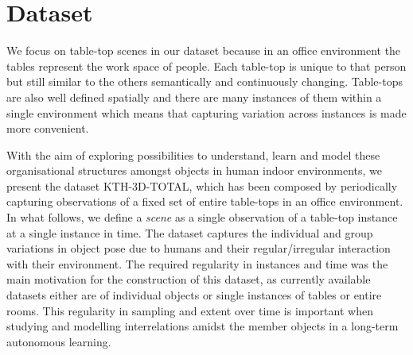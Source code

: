 \documentclass[letterpaper, 10 pt, conference]{ieeeconf}  %
\begin{document}
\section{Dataset}
\label{sec:Dataset}
We focus on table-top scenes in our dataset because in an office 
environment the tables represent the work space of people. Each 
table-top is unique to that person but still similar to the others 
semantically and continuously changing. Table-tops are also well 
defined spatially and there are many instances of them within a 
single environment which means that capturing variation across 
instances is made more convenient.

With the aim of exploring possibilities to understand, learn and model these organisational structures amongst objects in human indoor 
environments, we present the dataset KTH-3D-TOTAL, which has been composed by periodically capturing observations of a fixed set of entire 
table-tops in an office environment. In what follows, we define a \textit{scene} as a single observation of a table-top instance at a single 
instance in time. The dataset captures the individual and group variations in object pose due to humans and their regular/irregular interaction with their environment. The 
required regularity in instances and time was the main motivation for the construction of this dataset, as currently available datasets 
either are of individual objects or single instances of tables or entire rooms. This regularity in sampling and extent over time is 
important when studying and modelling interrelations amidst the member objects in a long-term autonomous learning. 
\end{document}
